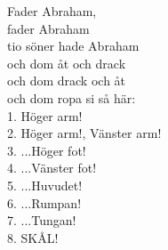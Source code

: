 
Fader Abraham, \\ fader Abraham \\ tio söner hade Abraham \\ och dom åt och drack \\ och dom drack och åt \\ och dom ropa si så här: \\ 1. Höger arm! \\ 2. Höger arm!, Vänster arm! \\ 3. ...Höger fot! \\ 4. ...Vänster fot! \\ 5. ...Huvudet! \\ 6. ...Rumpan! \\ 7. ...Tungan! \\ 8. SKÅL!